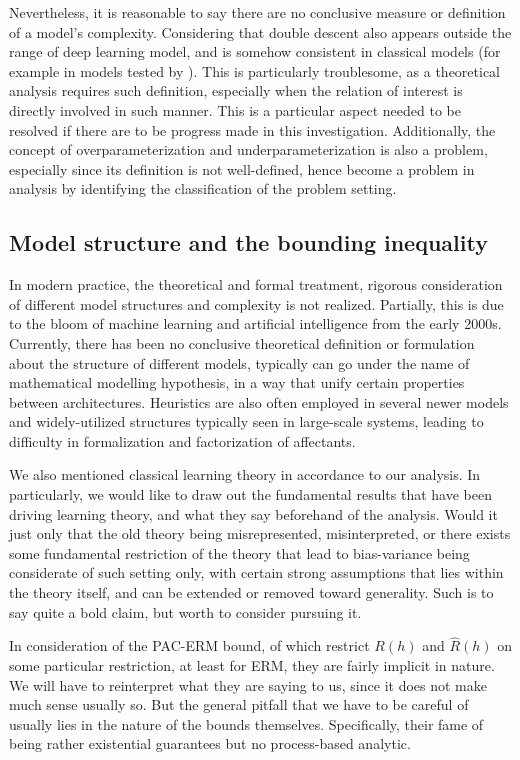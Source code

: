 Nevertheless, it is reasonable to say there are no conclusive measure or definition of a model's complexity. Considering that double descent also appears outside the range of deep learning model, and is somehow consistent in classical models (for example in models tested by \cite{belkin_reconciling_2019}). This is particularly troublesome, as a theoretical analysis requires such definition, especially when the relation of interest is directly involved in such manner. This is a particular aspect needed to be resolved if there are to be progress made in this investigation. Additionally, the concept of overparameterization and underparameterization is also a problem, especially since its definition is not well-defined, hence become a problem in analysis by identifying the classification of the problem setting. 
\subsection{Model structure and the bounding inequality}

In modern practice, the theoretical and formal treatment, rigorous consideration of different model structures and complexity is not realized. Partially, this is due to the bloom of machine learning and artificial intelligence from the early 2000s. Currently, there has been no conclusive theoretical definition or formulation about the structure of different models, typically can go under the name of mathematical modelling hypothesis, in a way that unify certain properties between architectures. Heuristics are also often employed in several newer models and widely-utilized structures typically seen in large-scale systems, leading to difficulty in formalization and factorization of affectants. 

We also mentioned classical learning theory in accordance to our analysis. In particularly, we would like to draw out the fundamental results that have been driving learning theory, and what they say beforehand of the analysis. Would it just only that the old theory being misrepresented, misinterpreted, or there exists some fundamental restriction of the theory that lead to bias-variance being considerate of such setting only, with certain strong assumptions that lies within the theory itself, and can be extended or removed toward generality. Such is to say quite a bold claim, but worth to consider pursuing it. 

In consideration of the PAC-ERM bound, of which restrict $R(h)$ and $\hat{R}(h)$ on some particular restriction, at least for ERM, they are fairly implicit in nature. We will have to reinterpret what they are saying to us, since it does not make much sense usually so. But the general pitfall that we have to be careful of usually lies in the nature of the bounds themselves. Specifically, their fame of being rather existential guarantees but no process-based analytic. 

